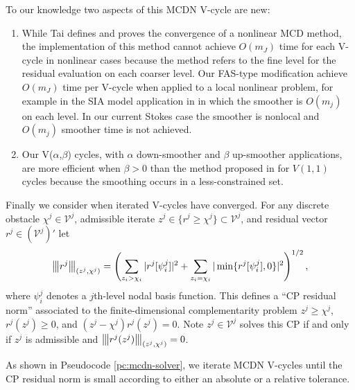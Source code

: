 \documentclass[letterpaper,final,12pt,reqno]{amsart}
\theoremstyle{claim}
\newcommand{\vertiii}[1]{{\left\vert\kern-0.25ex\left\vert\kern-0.25ex\left\vert #1 \right\vert\kern-0.25ex\right\vert\kern-0.25ex\right\vert}}
\numberwithin{equation}{section}
\numberwithin{figure}{section}
\numberwithin{table}{section}
\numberwithin{theorem}{section}
\begin{document}
To our knowledge two aspects of this MCDN V-cycle are new:
\begin{enumerate}
\item While Tai \cite{Tai2003} defines and proves the convergence of a nonlinear MCD method, the implementation of this method cannot achieve $O(m_J)$ time for each V-cycle in nonlinear cases because the method refers to the fine level for the residual evaluation on each coarser level.  Our FAS-type modification achieve $O(m_J)$ time per V-cycle when applied to a local nonlinear problem, for example in the SIA model application in \cite{Bueler2022} in which the smoother is $O(m_j)$ on each level.  In our current Stokes case the smoother is nonlocal and $O(m_j)$ smoother time is not achieved.
\item Our V($\alpha$,$\beta$) cycles, with $\alpha$ down-smoother and $\beta$ up-smoother applications, are more efficient when $\beta >0$ than the method proposed in \cite{GraeserKornhuber2009} for $V(1,1)$ cycles because the smoothing occurs in a less-constrained set.
\end{enumerate}

Finally we consider when iterated V-cycles have converged.  For any discrete obstacle $\chi^j \in \mathcal{V}^j$, admissible iterate $z^j\in \{r^j \ge \chi^j\} \subset \mathcal{V}^j$, and residual vector $r^j \in (\mathcal{V}^j)'$ let
\begin{equation}
\vertiii{r^j}_{(z^j,\chi^j)} = \left(\sum_{z_i > \chi_i} |r^j[\psi_i^j]|^2 + \sum_{z_i = \chi_i} |\min\{r^j[\psi_i^j],0\}|^2\right)^{1/2}, \label{eq:cpnorm}
\end{equation}
where $\psi_i^j$ denotes a $j$th-level nodal basis function.  This defines a ``CP residual norm'' associated to the finite-dimensional complementarity problem $z^j \ge \chi^j$, $r^j(z^j) \ge 0$, and $(z^j-\chi^j) r^j(z^j) = 0$.  Note $z^j \in \mathcal{V}^j$ solves this CP if and only if $z^j$ is admissible and $\vertiii{r^j(z^j)}_{(z^j,\chi^j)}=0$.

As shown in Pseudocode \ref{pc:mcdn-solver}, we iterate MCDN V-cycles until the CP residual norm is small according to either an absolute or a relative tolerance.
\end{document}
